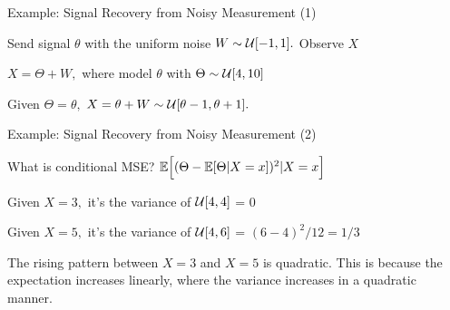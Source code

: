 \begin{frame}{Example: Signal Recovery from Noisy Measurement (1)}


\small
\plitemsep 0.03in
\bci

\item<1-> Send signal $\theta$ with the uniform noise $W \sim
  \mathcal U[-1,1].$ Observe $X$

\item $X = \Theta + W,$ where model $\theta$ with $\Theta \sim \mathcal U[4,10]$

\item<2-> Given $\Theta = \theta,$ $X = \theta + W \sim \mathcal U[\theta-1, \theta+1].$

{
\bigskip
{}
}
{
\centering
{}
}
\eci
\end{frame}

\begin{frame}{Example: Signal Recovery from Noisy Measurement (2)}


\plitemsep 0.07in
\bci

\item What is conditional MSE? $\mathbb{E}\Bigl[ (\Theta - \mathbb{E}[ \Theta | X=x ])^2 | X=x \Bigr]$

\item Given $X=3,$ it's the variance of $\mathcal U[4,4]$ = 0

\item Given $X=5,$ it's the variance of $\mathcal U[4,6]$ = $(6-4)^2/12 = 1/3$

 \item The rising pattern between $X=3$ and $X=5$ is quadratic. This is
   because the expectation increases linearly, where the variance
   increases in a quadratic manner.  

\eci

\vspace{-0.5cm}


\end{frame}


